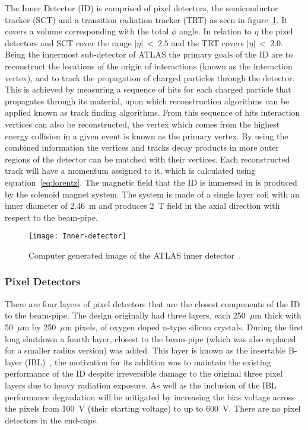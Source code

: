 The Inner Detector (ID) is comprised of pixel detectors, the semiconductor
tracker (SCT) and a transition radiation tracker (TRT) as seen in
figure~\ref{fig:ATLAS-inner-det}. It covers a volume corresponding with the
total $\phi$ angle. In relation to $\eta$ the pixel detectors and SCT cover the
range $|\eta|~<~2.5$ and the TRT covers $|\eta|~<~2.0$. Being the innermost
sub-detector of ATLAS the primary goals of the ID are to reconstruct the
locations of the origin of interactions (known as the interaction vertex), and
to track the propagation of charged particles through the detector. This is
achieved by measuring a sequence of hits for each charged particle that
propagates through its material, upon which reconstruction algorithms can be
applied known as track finding algorithms. From this sequence of hits
interaction vertices can also be reconstructed, the vertex which comes from the
highest energy collision in a given event is known as the primary vertex. By
using the combined information the vertices and tracks decay products in more
outer regions of the detector can be matched with their vertices. Each
reconstructed track will have a momentum assigned to it, which is calculated
using equation~\ref{eq:lorentz}. The magnetic field that the ID is immersed in
is produced by the solenoid magnet system. The system is made of a single layer
coil with an inner diameter of 2.46~m  and produces 2~T field in the axial
direction with respect to the beam-pipe.
\begin{figure}[h]
  \centering
  \texttt{[image: Inner-detector]}
  \caption{Computer generated image of the ATLAS inner
    detector~\cite{ATLAS-inner-det}.}%
  \label{fig:ATLAS-inner-det}
\end{figure}

\subsubsection{Pixel Detectors}

There are four layers of pixel detectors that are the closest components of the
ID to the beam-pipe. The design originally had three layers, each 250~$\mu$m
thick with 50~$\mu$m by 250~$\mu$m pixels, of oxygen doped n-type silicon
crystals. During the first long shutdown a fourth layer, closest to the
beam-pipe (which was also replaced for a smaller radius version) was added. This
layer is known as the insertable B-layer (IBL)~\cite{IBL-TDR}, the motivation
for its addition was to maintain the existing performance of the ID despite
irreversible damage to the original three pixel layers due to heavy radiation
exposure. As well as the inclusion of the IBL performance degradation will be
mitigated by increasing the bias voltage across the pixels from 100~V (their
starting voltage) to up to 600~V. There are no pixel detectors in the end-caps.

